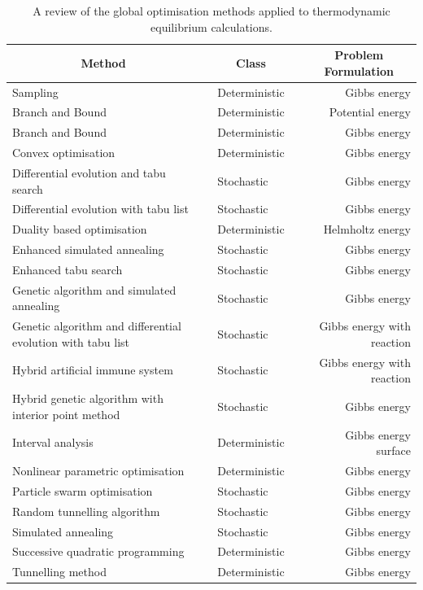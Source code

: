 \begin{table}[ht!]
	\caption{A review of the global optimisation methods applied to thermodynamic equilibrium calculations.}
	\centering
	\begin{tabular}{@{}p{} c l c r@{}}
	\toprule
	\multicolumn{1}{c}{\textbf{Method}} &\phantom{a} & \multicolumn{1}{c}{\textbf{Class}} &\phantom{a} & \multicolumn{1}{c}{\textbf{Problem Formulation}}\\
	\midrule
	Sampling \cite{Sundman15,Otis:2017ab} && Deterministic && Gibbs energy \\
	Branch and Bound \cite{CHEUNG2002169} && Deterministic && Potential energy \\
	Branch and Bound \cite{Piro16} && Deterministic  && Gibbs energy \\
	Convex optimisation \cite{ROSSI20111226}&& Deterministic && Gibbs energy \\
	Differential evolution and tabu search \cite{SRINIVAS2007760} && Stochastic && Gibbs energy \\
	Differential evolution with tabu list \cite{Srinivas:2007aa} && Stochastic && Gibbs energy \\
	Duality based optimisation \cite{PEREIRA20101} && Deterministic && Helmholtz energy \\
	Enhanced simulated annealing \cite{ZHU20003451} && Stochastic && Gibbs energy \\
	Enhanced tabu search \cite{Teh03} && Stochastic && Gibbs energy \\
	Genetic algorithm and simulated annealing \cite{Rangaiah01} && Stochastic && Gibbs energy \\
	Genetic algorithm and differential evolution with tabu list \cite{Bonilla-Petriciolet:2011aa} && Stochastic && Gibbs energy with reaction \\
	Hybrid artificial immune system \cite{Lin:2007aa} && Stochastic && Gibbs energy with reaction \\
	Hybrid genetic algorithm with interior point method \cite{STAUDT2009585} && Stochastic && Gibbs energy \\
	Interval analysis \cite{Scurto:2003aa} && Deterministic && Gibbs energy surface \\
	Nonlinear parametric optimisation \cite{Chaikunchuensakun:2002aa} && Deterministic && Gibbs energy \\
	Particle swarm optimisation \cite{Bonilla09,Piro16,Myint:2021aa} && Stochastic && Gibbs energy \\
	Random tunnelling algorithm \cite{Srinivas06} && Stochastic && Gibbs energy \\
	Simulated annealing \cite{Bonilla-Petriciolet:2009aa} && Stochastic && Gibbs energy \\
	Successive quadratic programming \cite{LUCIA20002557} && Deterministic && Gibbs energy \\
	Tunnelling method \cite{Nichita02,Nichita:2004aa} && Deterministic && Gibbs energy \\
	\bottomrule
	\end{tabular}
	\label{tab:globalopt}
\end{table}
